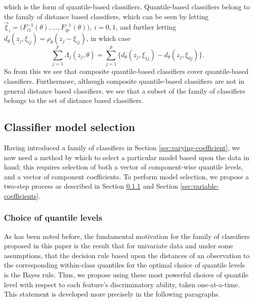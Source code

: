 which is the form of quantile-based classifiers.  Quantile-based classifiers
belong to the family of distance based classifiers, which can be seen by letting
$\vec{\xi}_i = \Big(F_{i1}^{-1}(\theta), \dots, F_{ip}^{-1}(\theta) \Big),~ i =
0, 1$, and further letting
$d_\theta(z_j, \xi_{ij}) = \rho_{\theta}(z_j - \xi_{ij})$, in which case
\begin{equation}
  \label{eq:quantile-is-distance-subset}
  \sum_{j=1}^p \Lambda_j (z_j, \theta) = \sum_{j=1}^p \Big\{ d_{\theta}(z_j,
  \xi_{1j}) - d_{\theta}(z_j, \xi_{0j}) \Big\}.
\end{equation}
So from this we see that composite quantile-based classifiers cover
quantile-based classifiers.  Furthermore, although composite quantile-based
classifiers are not in general distance based classifiers, we see that a subset
of the family of classifiers belongs to the set of distance based classifiers.




\subsection{Classifier model selection}
\label{sec:model-selection}

Having introduced a family of classifiers in Section
\ref{sec:varying-coefficient}, we now need a method by which to select a
particular model based upon the data in hand; this requires selection of both a
vector of component-wise quantile levels, and a vector of component
coefficients.  To perform model selection, we propose a two-step process as
described in Section \ref{sec:choice-of-quantile-lev} and Section
\ref{sec:variable-coefficients}.




\subsubsection{Choice of quantile levels}
\label{sec:choice-of-quantile-lev}

As has been noted before, the fundamental motivation for the family of
classifiers proposed in this paper is the result that for univariate data and
under some assumptions, that the decision rule based upon the distances of an
observation to the corresponding within-class quantiles for the optimal choice
of quantile levels is the Bayes rule.  Thus, we propose using these most
powerful choices of quantile level with respect to each feature's discriminatory
ability, taken one-at-a-time.  This statement is developed more precisely in the
following paragraphs.

